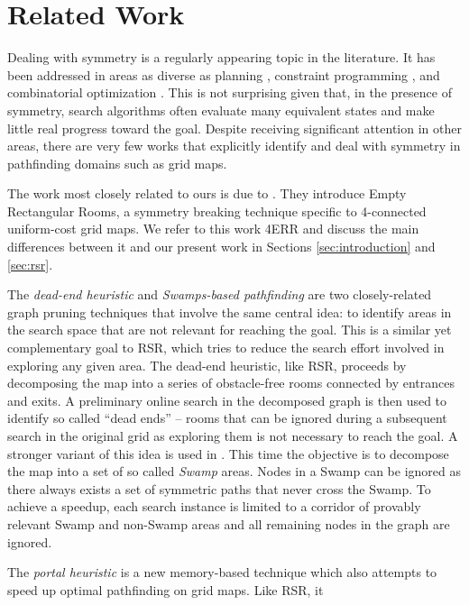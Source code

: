 \section{Related Work}
\label{sec:relatedwork}
Dealing with symmetry is a regularly appearing topic in the literature.  It has
been addressed in areas as diverse as planning \cite{fox99}, constraint programming
\cite{gent00}, and combinatorial optimization \cite{fukunaga08}.  This is not
surprising given that, in the presence of symmetry, search algorithms often
evaluate many equivalent states and make little real progress toward the goal.
Despite receiving significant attention in other areas, there are very few
works that explicitly identify and deal with symmetry in pathfinding domains 
such as grid maps. 
\par
The work most closely related to ours is due to \cite{harabor10}.  They
introduce Empty Rectangular Rooms, a symmetry breaking technique specific to
4-connected uniform-cost grid maps.  We refer to this work 4ERR and discuss the
main differences between it and our present work in Sections
\ref{sec:introduction} and \ref{sec:rsr}.
\par
The \emph{dead-end heuristic} \cite{bjornsson06} and \emph{Swamps-based
pathfinding} \cite{pochter10} are two closely-related graph pruning techniques
that involve the same central idea: to identify areas in the search space that
are not relevant for reaching the goal. This is a similar yet complementary goal
to RSR, which tries to reduce the search effort involved in exploring any given
area.  The dead-end heuristic, like RSR, proceeds by decomposing the map into a
series of obstacle-free rooms connected by entrances and exits.  A preliminary
online search in the decomposed graph is then used to identify so called ``dead
ends'' -- rooms that can be ignored during a subsequent search in the original
grid as exploring them is not necessary to reach the goal.  A stronger variant
of this idea is used in \cite{pochter10}.
This time the objective is to decompose the map into a set of so 
called \emph{Swamp} areas. Nodes in a Swamp can be ignored as there always
exists a set of symmetric paths that never cross the Swamp.  To achieve a
speedup, each search instance is limited to a corridor of provably relevant
Swamp and non-Swamp areas and all remaining nodes in the graph are ignored.
\par
The \emph{portal heuristic} \cite{goldenberg10} is a new memory-based technique
which also attempts to speed up optimal pathfinding on grid maps.  Like RSR, it
